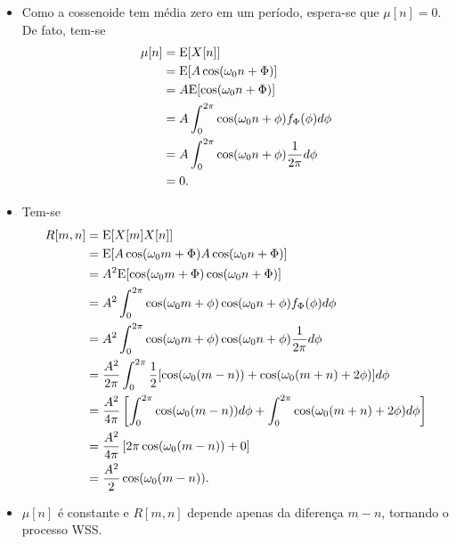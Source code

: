 \begin{respostas}

\begin{itemize}
    \item [a)] 
    Como a cossenoide tem média zero em um período, espera-se que $\mu[n] = 0$.
    De fato, tem-se
    \begin{align}
        \mu[n] &= \mathrm{E}\!\left[X[n]\right] \\
        &= \mathrm{E}\!\left[A\cos(\omega_0 n + \Phi)\right] \\
        &= A\mathrm{E}\!\left[\cos(\omega_0 n + \Phi)\right] \\
        &= A\int_{0}^{2\pi} \cos(\omega_0 n + \phi) f_\Phi(\phi) d\phi \\
        &= A\int_{0}^{2\pi} \cos(\omega_0 n + \phi) \frac{1}{2\pi} d\phi \\
        &= 0.
    \end{align}
    \item [b)] Tem-se
    \begin{align}
        R[m,n] &= \mathrm{E}\!\left[X[m]X[n]\right] \\
        &= \mathrm{E}\!\left[A\cos(\omega_0 m + \Phi)A\cos(\omega_0 n + \Phi)\right] \\
        &= A^2\mathrm{E}\!\left[\cos(\omega_0 m + \Phi)\cos(\omega_0 n + \Phi)\right] \\
        &= A^2\int_{0}^{2\pi} \cos(\omega_0 m + \phi)\cos(\omega_0 n + \phi) f_\Phi(\phi) d\phi \\
        &= A^2\int_{0}^{2\pi} \cos(\omega_0 m + \phi)\cos(\omega_0 n + \phi) \frac{1}{2\pi} d\phi \\
        &= \frac{A^2}{2\pi} \int_{0}^{2\pi} \frac{1}{2} [\cos(\omega_0 (m-n)) + \cos(\omega_0 (m+n) + 2\phi)] d\phi \\
        &= \frac{A^2}{4\pi} \left[
                \int_{0}^{2\pi} \cos(\omega_0 (m-n)) d\phi + 
                \int_{0}^{2\pi} \cos(\omega_0 (m+n) + 2\phi) d\phi 
            \right] \\
        &= \frac{A^2}{4\pi} \left[
                2\pi \cos(\omega_0 (m-n)) + 0
            \right] \\
        &= \frac{A^2}{2} \cos(\omega_0 (m-n)).
    \end{align}

    \item [c)] $\mu[n]$ é constante e $R[m,n]$ depende apenas da diferença $m-n$, tornando o processo WSS.
\end{itemize}

\end{respostas}